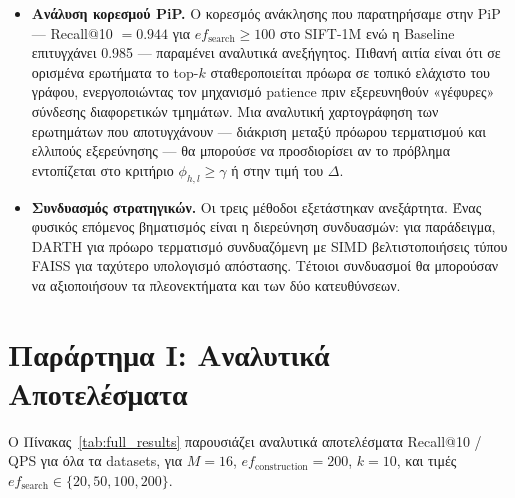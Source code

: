 \documentclass[12pt,a4paper]{article}
\begin{document}
\begin{itemize}
    \item \textbf{Ανάλυση κορεσμού PiP.} Ο κορεσμός ανάκλησης που παρατηρήσαμε στην PiP --- Recall@10 $= 0.944$ για $ef_{\text{search}} \geq 100$ στο SIFT-1M ενώ η Baseline επιτυγχάνει 0.985 --- παραμένει αναλυτικά ανεξήγητος. Πιθανή αιτία είναι ότι σε ορισμένα ερωτήματα το top-$k$ σταθεροποιείται πρόωρα σε τοπικό ελάχιστο του γράφου, ενεργοποιώντας τον μηχανισμό patience πριν εξερευνηθούν «γέφυρες» σύνδεσης διαφορετικών τμημάτων. Μια αναλυτική χαρτογράφηση των ερωτημάτων που αποτυγχάνουν --- διάκριση μεταξύ πρόωρου τερματισμού και ελλιπούς εξερεύνησης --- θα μπορούσε να προσδιορίσει αν το πρόβλημα εντοπίζεται στο κριτήριο $\phi_{h,l} \geq \gamma$ ή στην τιμή του $\Delta$.

    \item \textbf{Συνδυασμός στρατηγικών.} Οι τρεις μέθοδοι εξετάστηκαν ανεξάρτητα. Ένας φυσικός επόμενος βηματισμός είναι η διερεύνηση συνδυασμών: για παράδειγμα, DARTH για πρόωρο τερματισμό συνδυαζόμενη με SIMD βελτιστοποιήσεις τύπου FAISS για ταχύτερο υπολογισμό απόστασης. Τέτοιοι συνδυασμοί θα μπορούσαν να αξιοποιήσουν τα πλεονεκτήματα και των δύο κατευθύνσεων.
\end{itemize}

\clearpage
\appendix

\section*{Παράρτημα Ι: Αναλυτικά Αποτελέσματα}

Ο Πίνακας~\ref{tab:full_results} παρουσιάζει αναλυτικά αποτελέσματα Recall@10 / QPS για όλα τα datasets, για $M=16$, $ef_{\text{construction}}=200$, $k=10$, και τιμές $ef_{\text{search}} \in \{20, 50, 100, 200\}$.
\end{document}
